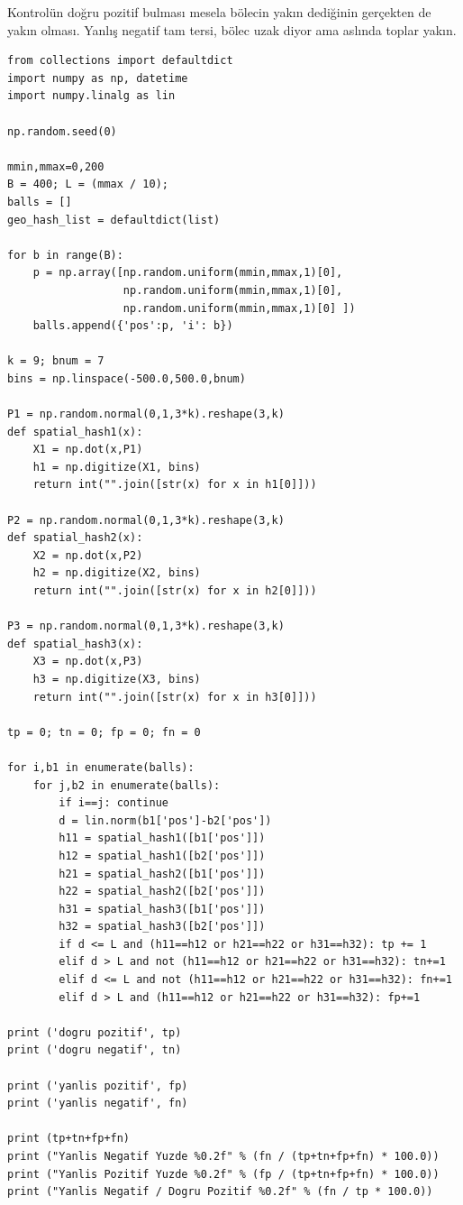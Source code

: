 \documentclass[12pt,fleqn]{article}\usepackage{../../common}
\begin{document}
Kontrolün doğru pozitif bulması mesela bölecin yakın dediğinin gerçekten de
yakın olması. Yanlış negatif tam tersi, bölec uzak diyor ama aslında toplar
yakın.

\begin{verbatim}
from collections import defaultdict 
import numpy as np, datetime
import numpy.linalg as lin

np.random.seed(0)

mmin,mmax=0,200
B = 400; L = (mmax / 10);
balls = []
geo_hash_list = defaultdict(list)
    
for b in range(B):
    p = np.array([np.random.uniform(mmin,mmax,1)[0],
                  np.random.uniform(mmin,mmax,1)[0],
                  np.random.uniform(mmin,mmax,1)[0] ])
    balls.append({'pos':p, 'i': b})

k = 9; bnum = 7
bins = np.linspace(-500.0,500.0,bnum)

P1 = np.random.normal(0,1,3*k).reshape(3,k)
def spatial_hash1(x):
    X1 = np.dot(x,P1)
    h1 = np.digitize(X1, bins)
    return int("".join([str(x) for x in h1[0]]))

P2 = np.random.normal(0,1,3*k).reshape(3,k)
def spatial_hash2(x):
    X2 = np.dot(x,P2)
    h2 = np.digitize(X2, bins)
    return int("".join([str(x) for x in h2[0]]))

P3 = np.random.normal(0,1,3*k).reshape(3,k)
def spatial_hash3(x):
    X3 = np.dot(x,P3)
    h3 = np.digitize(X3, bins)
    return int("".join([str(x) for x in h3[0]]))

tp = 0; tn = 0; fp = 0; fn = 0

for i,b1 in enumerate(balls):
    for j,b2 in enumerate(balls):
        if i==j: continue
        d = lin.norm(b1['pos']-b2['pos'])
        h11 = spatial_hash1([b1['pos']])
        h12 = spatial_hash1([b2['pos']])
        h21 = spatial_hash2([b1['pos']])
        h22 = spatial_hash2([b2['pos']])
        h31 = spatial_hash3([b1['pos']])
        h32 = spatial_hash3([b2['pos']])
        if d <= L and (h11==h12 or h21==h22 or h31==h32): tp += 1        
        elif d > L and not (h11==h12 or h21==h22 or h31==h32): tn+=1
        elif d <= L and not (h11==h12 or h21==h22 or h31==h32): fn+=1
        elif d > L and (h11==h12 or h21==h22 or h31==h32): fp+=1

print ('dogru pozitif', tp)
print ('dogru negatif', tn)

print ('yanlis pozitif', fp)
print ('yanlis negatif', fn)

print (tp+tn+fp+fn)
print ("Yanlis Negatif Yuzde %0.2f" % (fn / (tp+tn+fp+fn) * 100.0))
print ("Yanlis Pozitif Yuzde %0.2f" % (fp / (tp+tn+fp+fn) * 100.0))
print ("Yanlis Negatif / Dogru Pozitif %0.2f" % (fn / tp * 100.0))
\end{verbatim}
\end{document}
